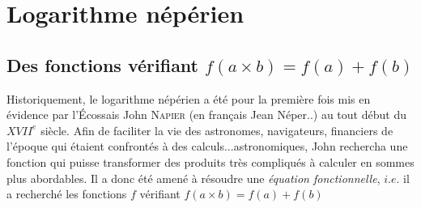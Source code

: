 \documentclass[french]{book}
\begin{document}
\chapter{Logarithme népérien}


\section{Des fonctions vérifiant $f(a \times b)=f(a)+
f(b)$}

 Historiquement, le logarithme népérien a été pour la
première fois mis en évidence par l'\'Ecossais John
\textsc{Napier} (en français Jean Néper..) au tout début du
$XVII^{e}$ siècle. Afin de faciliter la vie des astronomes,
navigateurs, financiers de l'époque qui étaient confrontés à des
calculs...astronomiques, John rechercha une fonction qui puisse
transformer des produits très compliqués à calculer en sommes plus
abordables. Il a donc été amené à résoudre une \textit{équation
fonctionnelle}, $i.e.$ il a recherché les fonctions $f$ vérifiant
$f(a\times b)=f(a)+f(b)$
\end{document}
